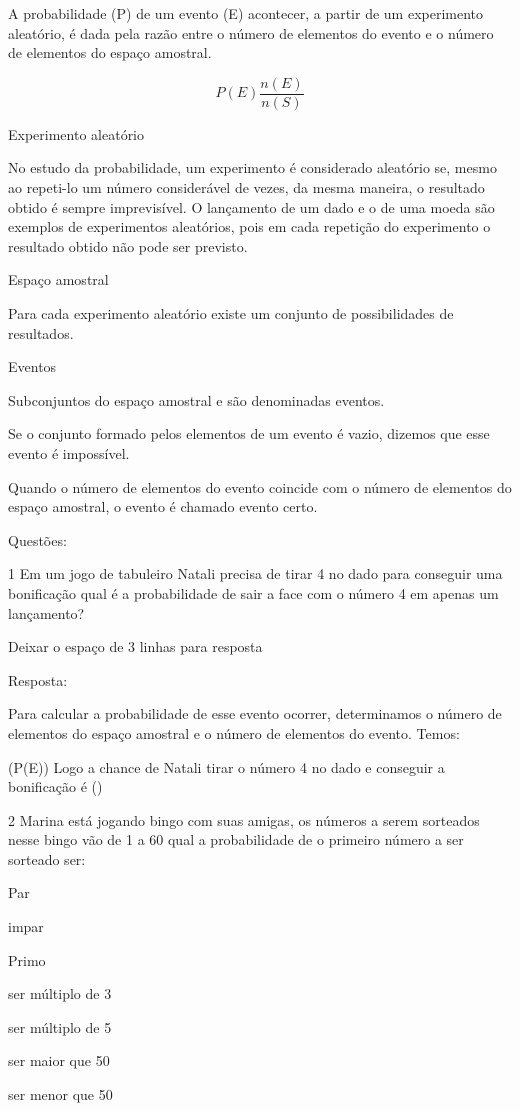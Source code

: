 A probabilidade (P) de um evento (E) acontecer, a partir de um
experimento aleatório, é dada pela razão entre o número de elementos do
evento e o número de elementos do espaço amostral.

\[P(E)\frac{n(E)}{n(S)}\]

Experimento aleatório

No estudo da probabilidade, um experimento é considerado aleatório se,
mesmo ao repeti-lo um número considerável de vezes, da mesma maneira, o
resultado obtido é sempre imprevisível. O lançamento de um dado e o de
uma moeda são exemplos de experimentos aleatórios, pois em cada
repetição do experimento o resultado obtido não pode ser previsto.

Espaço amostral

Para cada experimento aleatório existe um conjunto de possibilidades de
resultados.

Eventos

Subconjuntos do espaço amostral e são denominadas eventos.

Se o conjunto formado pelos elementos de um evento é vazio, dizemos que
esse evento é impossível.

Quando o número de elementos do evento coincide com o número de
elementos do espaço amostral, o evento é chamado evento certo.

Questões:

\num{1} Em um jogo de tabuleiro Natali precisa de tirar 4 no dado para
conseguir uma bonificação qual é a probabilidade de sair a face com o
número 4 em apenas um lançamento?

Deixar o espaço de 3 linhas para resposta

Resposta:

Para calcular a probabilidade de esse evento ocorrer, determinamos o
número de elementos do espaço amostral e o número de elementos do
evento. Temos:

(P(E)) Logo a chance de Natali tirar o número 4 no
dado e conseguir a bonificação é ()

\num{2} Marina está jogando bingo com suas amigas, os números a serem
sorteados nesse bingo vão de 1 a 60 qual a probabilidade de o primeiro
número a ser sorteado ser:

\item Par
\item impar
\item Primo
\item ser múltiplo de 3
\item ser múltiplo de 5
\item ser maior que 50
\item ser menor que 50

